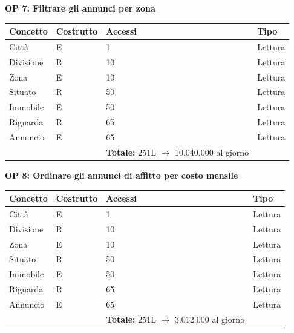 \documentclass[a4paper,12pt]{report}
\begin{document}
            \textbf{OP 7: Filtrare gli annunci per zona}
        	\begin{table}[H]
            \centering
             \begin{tabular}{llll}
             \rowcolor{yellow!20} \textbf{Concetto} & \textbf{Costrutto} & \textbf{Accessi} & \textbf{Tipo}\\ [0.5ex] 
             \hline
             Città & E & 1 & Lettura \\ 
             Divisione & R & 10 & Lettura \\ 
             Zona & E & 10 & Lettura \\ 
             Situato & R & 50 & Lettura \\ 
             Immobile & E & 50 & Lettura \\
             Riguarda & R & 65 & Lettura \\ 
             Annuncio & E & 65 & Lettura \\ 
             \hline
                \rowcolor{yellow!20} &   & \textbf{Totale:} 251L $\rightarrow$ 10.040.000 al giorno &  \\ [1ex] 
             
             \end{tabular}
            \end{table}

            \textbf{OP 8: Ordinare gli annunci di affitto per costo mensile}
        	\begin{table}[H]
            \centering
             \begin{tabular}{llll}
             \rowcolor{yellow!20} \textbf{Concetto} & \textbf{Costrutto} & \textbf{Accessi} & \textbf{Tipo}\\ [0.5ex] 
             \hline
             Città & E & 1 & Lettura \\ 
             Divisione & R & 10 & Lettura \\ 
             Zona & E & 10 & Lettura \\ 
             Situato & R & 50 & Lettura \\ 
             Immobile & E & 50 & Lettura \\ 
             Riguarda & R & 65 & Lettura \\ 
             Annuncio & E & 65 & Lettura \\ 
             \hline
                \rowcolor{yellow!20} &   & \textbf{Totale:} 251L $\rightarrow$ 3.012.000 al giorno &  \\ [1ex] 
             
             \end{tabular}
            \end{table}
\end{document}
